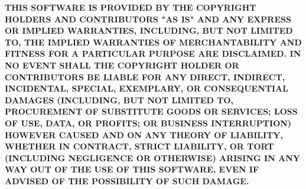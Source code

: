 \vfill
\textbf{THIS SOFTWARE IS PROVIDED BY THE COPYRIGHT HOLDERS AND CONTRIBUTORS "AS IS"
AND ANY EXPRESS OR IMPLIED WARRANTIES, INCLUDING, BUT NOT LIMITED TO, THE
IMPLIED WARRANTIES OF MERCHANTABILITY AND FITNESS FOR A PARTICULAR PURPOSE ARE
DISCLAIMED. IN NO EVENT SHALL THE COPYRIGHT HOLDER OR CONTRIBUTORS BE LIABLE
FOR ANY DIRECT, INDIRECT, INCIDENTAL, SPECIAL, EXEMPLARY, OR CONSEQUENTIAL
DAMAGES (INCLUDING, BUT NOT LIMITED TO, PROCUREMENT OF SUBSTITUTE GOODS OR
SERVICES; LOSS OF USE, DATA, OR PROFITS; OR BUSINESS INTERRUPTION) HOWEVER
CAUSED AND ON ANY THEORY OF LIABILITY, WHETHER IN CONTRACT, STRICT LIABILITY,
OR TORT (INCLUDING NEGLIGENCE OR OTHERWISE) ARISING IN ANY WAY OUT OF THE USE
OF THIS SOFTWARE, EVEN IF ADVISED OF THE POSSIBILITY OF SUCH DAMAGE.}
\newpage